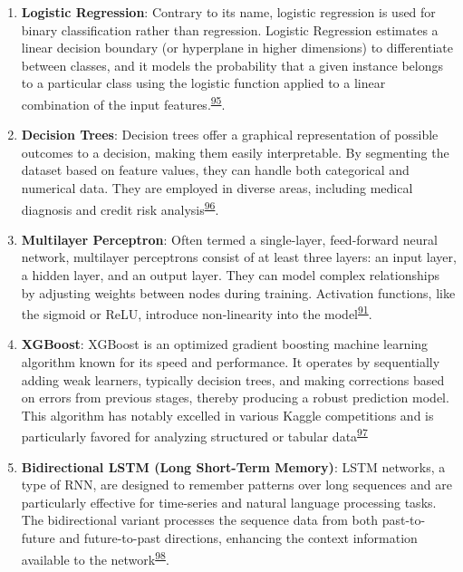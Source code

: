 \documentclass[
  10pt,
]{scrbook}
\let\originaltextbf\textbf
\renewcommand{\textbf}[1]{\textcolor{color1}{\textsf{\originaltextbf{#1}}}}
\begin{document}
\begin{enumerate}
\def\labelenumi{\arabic{enumi}.}
\item
  \textbf{Logistic Regression}: Contrary to its name, logistic
  regression is used for binary classification rather than regression.
  Logistic Regression estimates a linear decision boundary (or
  hyperplane in higher dimensions) to differentiate between classes, and
  it models the probability that a given instance belongs to a
  particular class using the logistic function applied to a linear
  combination of the input
  features.\textsuperscript{\protect\hyperlink{ref-McCullagh_1989}{95}}.
\item
  \textbf{Decision Trees}: Decision trees offer a graphical
  representation of possible outcomes to a decision, making them easily
  interpretable. By segmenting the dataset based on feature values, they
  can handle both categorical and numerical data. They are employed in
  diverse areas, including medical diagnosis and credit risk
  analysis\textsuperscript{\protect\hyperlink{ref-quinlan_1986}{96}}.
\item
  \textbf{Multilayer Perceptron}: Often termed a single-layer,
  feed-forward neural network, multilayer perceptrons consist of at
  least three layers: an input layer, a hidden layer, and an output
  layer. They can model complex relationships by adjusting weights
  between nodes during training. Activation functions, like the sigmoid
  or ReLU, introduce non-linearity into the
  model\textsuperscript{\protect\hyperlink{ref-Goodfellow-et-al-2016}{91}}.
\item
  \textbf{XGBoost}: XGBoost is an optimized gradient boosting machine
  learning algorithm known for its speed and performance. It operates by
  sequentially adding weak learners, typically decision trees, and
  making corrections based on errors from previous stages, thereby
  producing a robust prediction model. This algorithm has notably
  excelled in various Kaggle competitions and is particularly favored
  for analyzing structured or tabular
  data\textsuperscript{\protect\hyperlink{ref-Chen_xgboost_2016}{97}}
\item
  \textbf{Bidirectional LSTM (Long Short-Term Memory)}: LSTM networks, a
  type of RNN, are designed to remember patterns over long sequences and
  are particularly effective for time-series and natural language
  processing tasks. The bidirectional variant processes the sequence
  data from both past-to-future and future-to-past directions, enhancing
  the context information available to the
  network\textsuperscript{\protect\hyperlink{ref-graves_2005}{98}}.
\end{enumerate}
\end{document}
